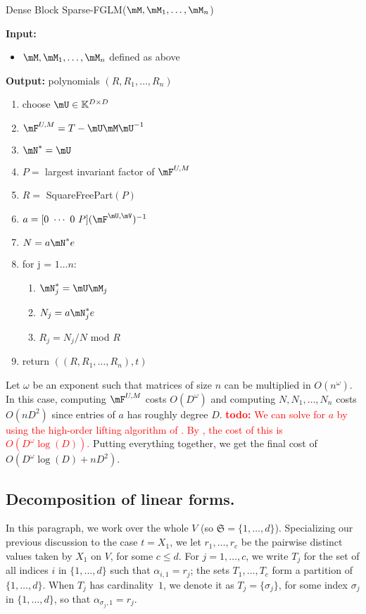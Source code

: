 \documentclass[12pt]{article}
\newcommand{\todo}[1]{\textcolor{red}{{\bf todo:} #1}}
\begin{document}
\begin{algorithm}[H]
	\caption{Dense Block Sparse-FGLM($\mM,\mM_1,\dots,\mM_n$)}
	{\bf Input:} \vspace{-0.5em}
	\begin{itemize}
		\item $\mM,\mM_1,\dots,\mM_n$ defined as above
	\end{itemize}
	{\bf Output:} polynomials $(R,R_1,\dots,R_n)$
  \begin{enumerate}[{\bf 1.}]
		\item choose $\mU \in \mathbb{K}^{D\times D}$
		\item $\mF^{U,M} = T - \mU\mM\mU^{-1}$
		\item $\mN^{*} = \mU$
		\item $P =$ largest invariant factor of $\mF^{U,M}$
		\item $R =$ SquareFreePart$(P)$
		\item {\sf $a = [0 ~\cdots~ 0~ P] (\mF^{\mU,\mV})^{-1}$}
		\item {\sf $N=a\mN^*e$}
		\item {for j = $1 \dots n$:}
      \begin{enumerate}[{\bf 8.1.}]
			\item $\mN_j^* = \mU\mM_j$
			\item $N_j = a\mN_j^*e$
			\item $R_j = N_j/N$ mod $R$
		\end{enumerate}
		\item return $((R, R_1,\dots,R_n),t)$
	\end{enumerate}
	\label{algo:dense-block-sparse-fglm}
\end{algorithm}
Let $\omega$ be an exponent such that matrices of size $n$ can be multiplied
in $O(n^{\omega})$. In this case, computing $\mF^{U,M}$ costs $O(D^\omega)$
and computing $N,N_1,\dots,N_n$ costs $O(nD^2)$ since entries of $a$ has roughly degree $D$. \todo{We can solve for $a$ by
using the high-order lifting algorithm of \cite[Algorithm~5]{Stor03}. 
By \cite[Corollary~16]{Stor03}, the cost of this is $O(D^\omega \log(D))$.}
Putting everything together, we get the final cost of $O(D^\omega\log(D) + nD^2)$.

\subsection{Decomposition of linear forms.}

In this paragraph, we work over the whole $V$ (so
$\mathfrak{S}=\{1,\dots,d\}$).  Specializing our previous discussion
to the case $t=X_1$, we let $r_1,\dots,r_c$ be the pairwise distinct
values taken by $X_1$ on $V$, for some $c \le d$.  For
$j=1,\dots,c$, we write $T_j$ for the set of all indices $i$ in
$\{1,\dots,d\}$ such that $\alpha_{i,1}=r_j$; the sets $T_1,\dots,T_c$
form a partition of $\{1,\dots,d\}$. When $T_j$ has cardinality~$1$,
we denote it as $T_j=\{\sigma_j\}$, for some index $\sigma_j$ in
$\{1,\dots,d\}$, so that $\alpha_{\sigma_j,1}=r_j$.
\end{document}
